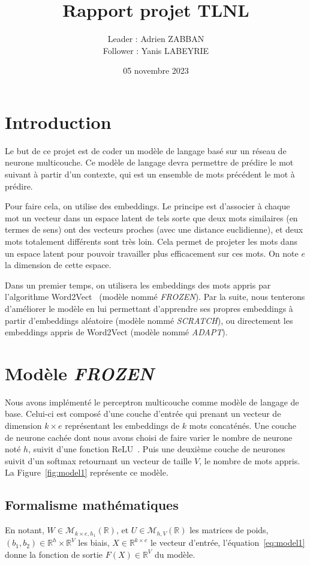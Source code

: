 \documentclass[a4paper]{article}
\title{Rapport projet TLNL}
\author{Leader : Adrien ZABBAN \\ Follower : Yanis LABEYRIE}
\date{05 novembre 2023}
\begin{document}
\maketitle


\section{Introduction}

Le but de ce projet est de coder un modèle de langage basé sur un réseau de neurone multicouche. Ce modèle de langage devra permettre 
de prédire le mot suivant à partir d'un contexte, qui est un ensemble de mots précédent le mot à prédire. 

Pour faire cela, on utilise des embeddings. Le principe est d'associer à chaque mot un vecteur dans un espace latent de tels sorte que 
deux mots similaires (en termes de sens) ont des vecteurs proches (avec une distance euclidienne), et deux mots totalement différents 
sont très loin. Cela permet de projeter les mots dans un espace latent pour pouvoir travailler plus efficacement sur ces mots. 
On note $e$ la dimension de cette espace.

Dans un premier temps, on utilisera les embeddings des mots appris par l'algorithme Word2Vect~\cite{mikolov2013efficient} 
(modèle nommé \textit{FROZEN}). Par la suite, nous tenterons d'améliorer le modèle en lui permettant d'apprendre ses propres 
embeddings à partir d'embeddings aléatoire (modèle nommé \textit{SCRATCH}), ou directement les embeddings appris de Word2Vect 
(modèle nommé \textit{ADAPT}).


\section{Modèle \textit{FROZEN}}

Nous avons implémenté le perceptron multicouche comme modèle de langage de base. Celui-ci est composé d'une couche d'entrée qui 
prenant un vecteur de dimension $k \times e$ représentant les embeddings de $k$ mots concaténés. Une couche de neurone cachée dont 
nous avons choisi de faire varier le nombre de neurone noté $h$, suivit d'une fonction ReLU~\cite{DBLP:journals/corr/abs-1803-08375}. 
Puis une deuxième couche de neurones suivit d'un softmax retournant un vecteur de taille $V$, le nombre de mots appris. 
La Figure~\ref{fig:model1} représente ce modèle.

\subsection{Formalisme mathématiques}
En notant, $W \in \mathcal{M}_{k \times e, h_1}(\mathbb{R})$, et $U \in \mathcal{M}_{h, V}(\mathbb{R})$ les matrices de poids, 
$(b_1,b_2) \in \mathbb{R}^{h} \times \mathbb{R}^{V}$ les biais, $X \in \mathbb{R}^{k \times e}$ le vecteur d'entrée, 
l'équation~\eqref{eq:model1} donne la fonction de sortie $F(X) \in \mathbb{R}^{V}$ du modèle. 
\end{document}
